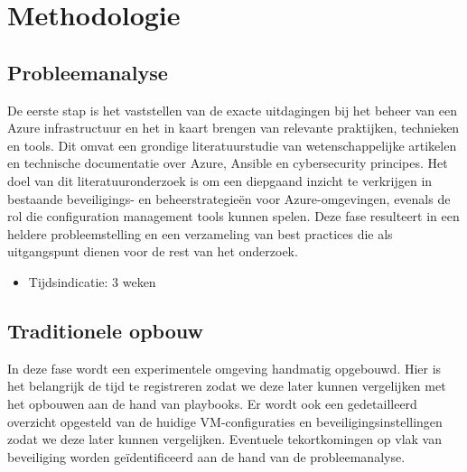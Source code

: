 
\section{Methodologie}%
\label{sec:methodologie}

\subsection{Probleemanalyse}%

De eerste stap is het vaststellen van de exacte uitdagingen bij het beheer van een Azure infrastructuur en het in kaart brengen van relevante praktijken, technieken en tools.
Dit omvat een grondige literatuurstudie van wetenschappelijke artikelen en technische documentatie over Azure, Ansible en cybersecurity principes.
Het doel van dit literatuuronderzoek is om een diepgaand inzicht te verkrijgen in bestaande beveiligings- en beheerstrategieën voor Azure-omgevingen, evenals de rol die configuration management tools kunnen spelen.
Deze fase resulteert in een heldere probleemstelling en een verzameling van best practices die als uitgangspunt dienen voor de rest van het onderzoek.

\begin{itemize}
  \item Tijdsindicatie: 3 weken
\end{itemize}

\subsection{Traditionele opbouw}%

In deze fase wordt een experimentele omgeving handmatig opgebouwd.
Hier is het belangrijk de tijd te registreren zodat we deze later kunnen vergelijken met het opbouwen aan de hand van playbooks.
Er wordt ook een gedetailleerd overzicht opgesteld van de huidige VM-\linebreak configuraties en beveiligingsinstellingen zodat we deze later kunnen vergelijken.
Eventuele tekortkomingen op vlak van beveiliging worden geïdentificeerd aan de hand van de probleemanalyse.


